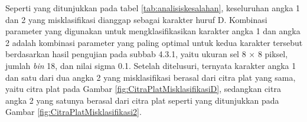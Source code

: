 \noindent Seperti yang ditunjukkan pada tabel \ref{tab:analisiskesalahan}, keseluruhan angka 1 dan 2 yang misklasifikasi dianggap sebagai karakter huruf D. Kombinasi parameter yang digunakan untuk mengklasifikasikan karakter angka 1 dan angka 2 adalah kombinasi parameter yang paling optimal untuk kedua karakter tersebut berdasarkan hasil pengujian pada subbab 4.3.1, yaitu ukuran sel 8 $\times$ 8 piksel, jumlah \textit{bin} 18, dan nilai sigma 0.1. Setelah ditelusuri, ternyata karakter angka 1 dan satu dari dua angka 2 yang misklasifikasi berasal dari citra plat yang sama, yaitu citra plat pada Gambar \ref{fig:CitraPlatMisklasifikasiD}, sedangkan citra angka 2 yang satunya berasal dari citra plat seperti yang ditunjukkan pada Gambar \ref{fig:CitraPlatMisklasifikasi2}.

